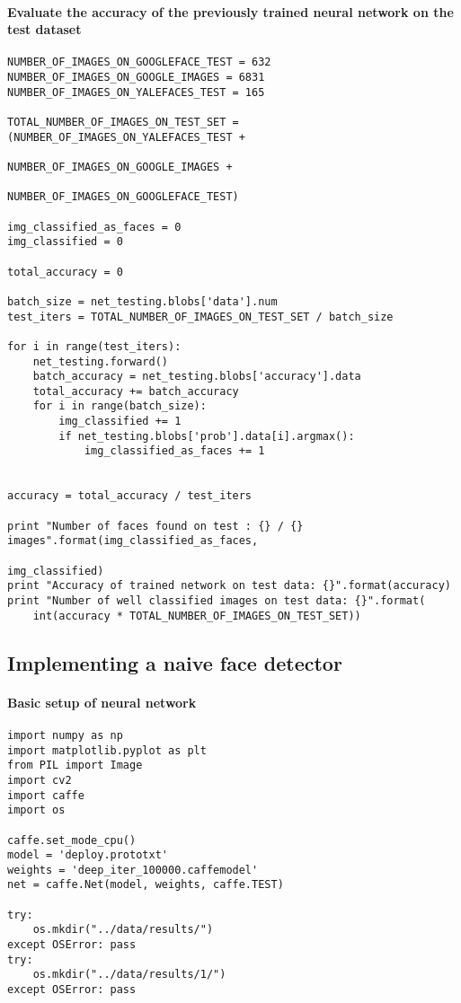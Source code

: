 \documentclass[french]{article}
\begin{document}
\paragraph{Evaluate the accuracy of the previously trained neural network on the test dataset}

\begin{verbatim}
NUMBER_OF_IMAGES_ON_GOOGLEFACE_TEST = 632
NUMBER_OF_IMAGES_ON_GOOGLE_IMAGES = 6831
NUMBER_OF_IMAGES_ON_YALEFACES_TEST = 165

TOTAL_NUMBER_OF_IMAGES_ON_TEST_SET = (NUMBER_OF_IMAGES_ON_YALEFACES_TEST +
                                      NUMBER_OF_IMAGES_ON_GOOGLE_IMAGES +
                                      NUMBER_OF_IMAGES_ON_GOOGLEFACE_TEST)

img_classified_as_faces = 0
img_classified = 0

total_accuracy = 0

batch_size = net_testing.blobs['data'].num
test_iters = TOTAL_NUMBER_OF_IMAGES_ON_TEST_SET / batch_size

for i in range(test_iters):
    net_testing.forward()
    batch_accuracy = net_testing.blobs['accuracy'].data
    total_accuracy += batch_accuracy
    for i in range(batch_size):
        img_classified += 1
        if net_testing.blobs['prob'].data[i].argmax():
            img_classified_as_faces += 1
            

accuracy = total_accuracy / test_iters

print "Number of faces found on test : {} / {} images".format(img_classified_as_faces,
                                                              img_classified)
print "Accuracy of trained network on test data: {}".format(accuracy)
print "Number of well classified images on test data: {}".format(
    int(accuracy * TOTAL_NUMBER_OF_IMAGES_ON_TEST_SET))
\end{verbatim}

\subsection{Implementing a naive face detector}

\paragraph{Basic setup of neural network}

\begin{verbatim}
import numpy as np
import matplotlib.pyplot as plt
from PIL import Image
import cv2
import caffe
import os

caffe.set_mode_cpu()
model = 'deploy.prototxt'
weights = 'deep_iter_100000.caffemodel'
net = caffe.Net(model, weights, caffe.TEST)

try:
    os.mkdir("../data/results/")
except OSError: pass
try:
    os.mkdir("../data/results/1/")
except OSError: pass
\end{verbatim}
\end{document}
